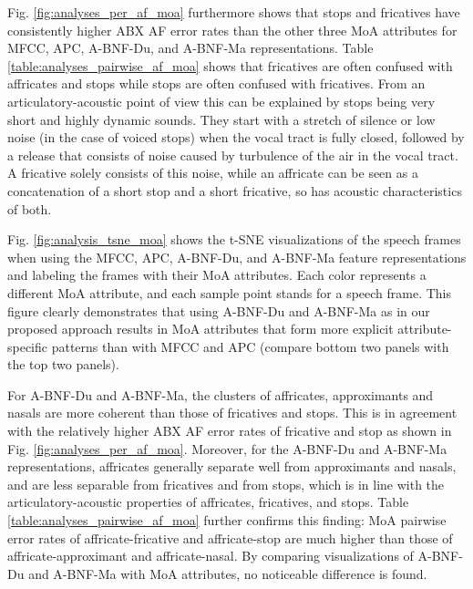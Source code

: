 \documentclass[transmag]{IEEEtran}
\begin{document}
 Fig. \ref{fig:analyses_per_af_moa} furthermore shows that stops and fricatives have consistently higher ABX AF error rates than the other three MoA attributes for MFCC, APC, A-BNF-Du, and A-BNF-Ma representations.  Table  \ref{table:analyses_pairwise_af_moa}  shows that fricatives are often confused with affricates and stops while stops are often confused with fricatives. From an articulatory-acoustic point of view this can be explained by stops being very short and highly dynamic sounds. They start with a stretch of silence or low noise (in the case of voiced stops) when the vocal tract is fully closed, followed by a release that consists of noise caused by turbulence of the air in the vocal tract. A fricative solely consists of this noise, while an affricate can be seen as a concatenation of a short  stop and a short fricative, so has acoustic characteristics of both.

Fig. \ref{fig:analysis_tsne_moa} shows the t-SNE  visualizations  of the speech frames when using the MFCC,  APC, A-BNF-Du,  and  A-BNF-Ma  feature representations and labeling the frames with their MoA attributes. Each color represents a different MoA attribute, and each sample point  stands  for  a  speech  frame.  This figure clearly demonstrates that using A-BNF-Du and A-BNF-Ma as in our  proposed approach results in MoA attributes that form more explicit attribute-specific patterns than with MFCC and APC (compare bottom two panels with the top two panels). 

For A-BNF-Du and A-BNF-Ma, the clusters of affricates, approximants and nasals are more coherent than those of fricatives and stops. This is in agreement with the relatively higher ABX AF error rates of fricative and stop as shown in Fig. \ref{fig:analyses_per_af_moa}. Moreover, for the A-BNF-Du and A-BNF-Ma representations, affricates generally separate well from approximants and nasals, and are less separable from fricatives and from stops, which is in line with the articulatory-acoustic properties of affricates, fricatives, and stops. Table \ref{table:analyses_pairwise_af_moa} further confirms this finding: MoA pairwise error rates of affricate-fricative and affricate-stop are much higher  than those of affricate-approximant and affricate-nasal. By comparing visualizations of A-BNF-Du and A-BNF-Ma with MoA attributes, no noticeable difference is found.
\end{document}
